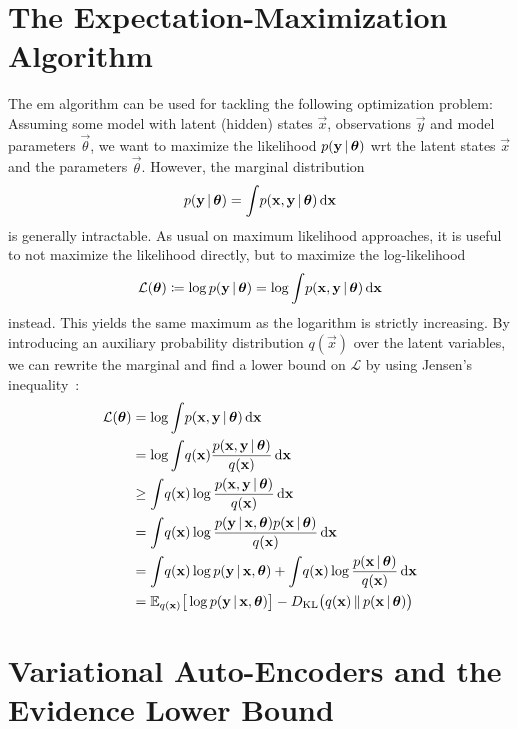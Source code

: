 	\section{The Expectation-Maximization Algorithm}
		The \ac{em} algorithm can be used for tackling the following optimization problem: Assuming some model with latent (hidden) states \(\vec{x}\), observations \(\vec{y}\) and model parameters \(\vec{\theta}\), we want to maximize the likelihood \( p(\boldsymbol{\mathrm{y}} \,\vert\, \boldsymbol{\mathrm{\theta}}) \) \ac{wrt} the latent states \(\vec{x}\) and the parameters \(\vec{\theta}\). However, the marginal distribution
		\begin{align*}
			p(\boldsymbol{\mathrm{y}} \,\vert\, \boldsymbol{\mathrm{\theta}}) = \int\! p(\boldsymbol{\mathrm{x}}, \boldsymbol{\mathrm{y}} \,\vert\, \boldsymbol{\mathrm{\theta}}) \dd{\boldsymbol{\mathrm{x}}}
		\end{align*}
		is generally intractable. As usual on maximum likelihood approaches, it is useful to not maximize the likelihood directly, but to maximize the log-likelihood
		\begin{align*}
			\mathcal{L}(\boldsymbol{\mathrm{\theta}}) \coloneqq \log p(\boldsymbol{\mathrm{y}} \,\vert\, \boldsymbol{\mathrm{\theta}}) = \log \int\! p(\boldsymbol{\mathrm{x}}, \boldsymbol{\mathrm{y}} \,\vert\, \boldsymbol{\mathrm{\theta}}) \dd{\boldsymbol{\mathrm{x}}}
		\end{align*}
		instead. This yields the same maximum as the logarithm is strictly increasing. By introducing an auxiliary probability distribution \( q(\vec{x}) \) over the latent variables, we can rewrite the marginal and find a lower bound on \(\mathcal{L}\) by using Jensen's inequality~\cite{jensenFonctionsConvexesInegalites1906}:
		\begin{align*}
			\mathcal{L}(\boldsymbol{\mathrm{\theta}})
				&= \log \int\! p(\boldsymbol{\mathrm{x}}, \boldsymbol{\mathrm{y}} \,\vert\, \boldsymbol{\mathrm{\theta}}) \dd{\boldsymbol{\mathrm{x}}} \\
				&= \log \int\! q(\boldsymbol{\mathrm{x}}) \frac{p(\boldsymbol{\mathrm{x}}, \boldsymbol{\mathrm{y}} \,\vert\, \boldsymbol{\mathrm{\theta}})}{q(\boldsymbol{\mathrm{x}})} \dd{\boldsymbol{\mathrm{x}}} \\
				&\geq \int\! q(\boldsymbol{\mathrm{x}}) \log \frac{p(\boldsymbol{\mathrm{x}}, \boldsymbol{\mathrm{y}} \,\vert\, \boldsymbol{\mathrm{\theta}})}{q(\boldsymbol{\mathrm{x}})} \dd{\boldsymbol{\mathrm{x}}} \\
				&= \int\! q(\boldsymbol{\mathrm{x}}) \log \frac{p(\boldsymbol{\mathrm{y}} \,\vert\, \boldsymbol{\mathrm{x}}, \boldsymbol{\mathrm{\theta}}) p(\boldsymbol{\mathrm{x}} \,\vert\, \boldsymbol{\mathrm{\theta}})}{q(\boldsymbol{\mathrm{x}})} \dd{\boldsymbol{\mathrm{x}}} \\
				&= \int\! q(\boldsymbol{\mathrm{x}}) \log p(\boldsymbol{\mathrm{y}} \,\vert\, \boldsymbol{\mathrm{x}}, \boldsymbol{\mathrm{\theta}}) + \int\! q(\boldsymbol{\mathrm{x}}) \log \frac{p(\boldsymbol{\mathrm{x}} \,\vert\, \boldsymbol{\mathrm{\theta}})}{q(\boldsymbol{\mathrm{x}})} \dd{\boldsymbol{\mathrm{x}}} \\
				&= \mathbb{E}_{q(\boldsymbol{\mathrm{x}})}\big[ \log p(\boldsymbol{\mathrm{y}} \,\vert\, \boldsymbol{\mathrm{x}}, \boldsymbol{\mathrm{\theta}}) \big] - D_\mathrm{KL}\big( q(\boldsymbol{\mathrm{x}}) \,\Vert\, p(\boldsymbol{\mathrm{x}} \,\vert\, \boldsymbol{\mathrm{\theta}}) \big)
		\end{align*}

	\section{Variational Auto-Encoders and the Evidence Lower Bound}
